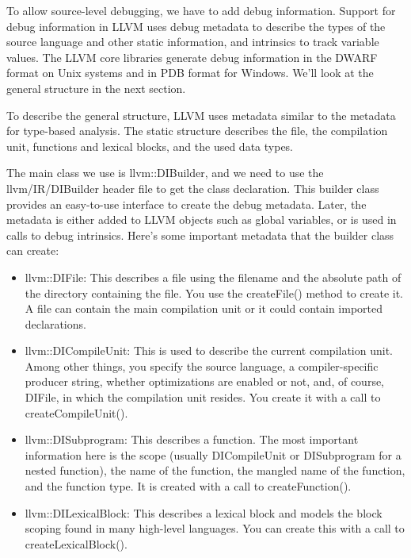 
To allow source-level debugging, we have to add debug information. Support for debug information in LLVM uses debug metadata to describe the types of the source language and other static information, and intrinsics to track variable values. The LLVM core libraries generate debug information in the DWARF format on Unix systems and in PDB format for Windows. We’ll look at the general structure in the next section.


To describe the general structure, LLVM uses metadata similar to the metadata for type-based analysis. The static structure describes the file, the compilation unit, functions and lexical blocks, and the used data types.

The main class we use is llvm::DIBuilder, and we need to use the llvm/IR/DIBuilder header file to get the class declaration. This builder class provides an easy-to-use interface to create the debug metadata. Later, the metadata is either added to LLVM objects such as global variables, or is used in calls to debug intrinsics. Here’s some important metadata that the builder class can create:

\begin{itemize}
\item
llvm::DIFile: This describes a file using the filename and the absolute path of the directory containing the file. You use the createFile() method to create it. A file can contain the main compilation unit or it could contain imported declarations.

\item
llvm::DICompileUnit: This is used to describe the current compilation unit. Among other things, you specify the source language, a compiler-specific producer string, whether optimizations are enabled or not, and, of course, DIFile, in which the compilation unit resides. You create it with a call to createCompileUnit().

\item
llvm::DISubprogram: This describes a function. The most important information here is the scope (usually DICompileUnit or DISubprogram for a nested function), the name of the function, the mangled name of the function, and the function type. It is created with a call to createFunction().

\item
llvm::DILexicalBlock: This describes a lexical block and models the block scoping found in many high-level languages. You can create this with a call to createLexicalBlock().
\end{itemize}

